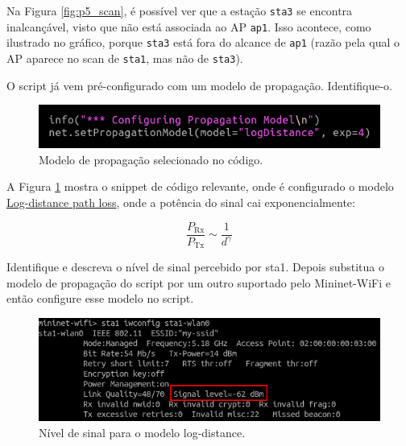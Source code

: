 \documentclass{article}
\begin{document}
Na Figura \ref{fig:p5_scan}, é possível ver que a estação
\texttt{sta3} se encontra inalcançável, visto que não está
associada ao AP \texttt{ap1}. Isso acontece, como ilustrado
no gráfico, porque \texttt{sta3} está fora do alcance de
\texttt{ap1} (razão pela qual o AP aparece no scan de
\texttt{sta1}, mas não de \texttt{sta3}).

\begin{tcolorbox}
    O script já vem pré-configurado com um modelo de propagação. Identifique-o.
\end{tcolorbox}

\begin{figure}[!htb]
\centering
\includegraphics[width=0.8\columnwidth]{images/p5_logdistance.png}
\caption{Modelo de propagação selecionado no código.}
\label{fig:p5_logdistance}
\end{figure}

A Figura \ref{fig:p5_logdistance} mostra o snippet
de código relevante, onde é configurado o modelo
\href{https://en.wikipedia.org/wiki/Log-distance_path_loss_model}{Log-distance path loss}, onde a potência do sinal cai exponencialmente:

\begin{equation*}
    \frac{P_{\text{Rx}}}{P_{\text{Tx}}} \sim \frac{1}{d^\gamma}
\end{equation*}

\begin{tcolorbox}
    Identifique e descreva o nível de sinal percebido por sta1. Depois substitua o modelo de propagação do script por um outro suportado pelo Mininet-WiFi e então configure esse modelo no script.
\end{tcolorbox}

\begin{figure}[!htb]
\centering
\includegraphics[width=0.8\columnwidth]{images/p5_signal_level_before.png}
\caption{Nível de sinal para o modelo log-distance.}
\label{fig:p5_signal_level_before}
\end{figure}
\end{document}
